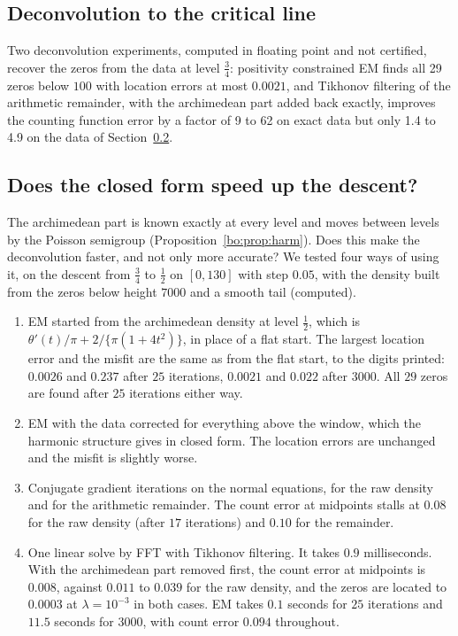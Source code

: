 \subsection{Deconvolution to the critical line}

Two deconvolution experiments, computed in floating point and not certified, recover the zeros from the data at level $\frac34$: positivity constrained EM finds all 29 zeros below $100$ with location errors at most $0.0021$, and Tikhonov filtering of the arithmetic remainder, with the archimedean part added back exactly, improves the counting function error by a factor of 9 to 62 on exact data but only 1.4 to 4.9 on the data of Section~\ref{bo:sec:speed}.

\subsection{Does the closed form speed up the descent?}\label{bo:sec:speed}

The archimedean part is known exactly at every level and moves between levels by the Poisson semigroup (Proposition~\ref{bo:prop:harm}). Does this make the deconvolution faster, and not only more accurate? We tested four ways of using it, on the descent from $\frac34$ to $\frac12$ on $[0,130]$ with step $0.05$, with the density built from the zeros below height $7000$ and a smooth tail (computed).

\begin{enumerate}
\item EM started from the archimedean density at level $\frac12$, which is $\theta'(t)/\pi+2/\{\pi(1+4t^2)\}$, in place of a flat start. The largest location error and the misfit are the same as from the flat start, to the digits printed: $0.0026$ and $0.237$ after $25$ iterations, $0.0021$ and $0.022$ after $3000$. All $29$ zeros are found after $25$ iterations either way.
\item EM with the data corrected for everything above the window, which the harmonic structure gives in closed form. The location errors are unchanged and the misfit is slightly worse.
\item Conjugate gradient iterations on the normal equations, for the raw density and for the arithmetic remainder. The count error at midpoints stalls at $0.08$ for the raw density (after $17$ iterations) and $0.10$ for the remainder.
\item One linear solve by FFT with Tikhonov filtering. It takes $0.9$ milliseconds. With the archimedean part removed first, the count error at midpoints is $0.008$, against $0.011$ to $0.039$ for the raw density, and the zeros are located to $0.0003$ at $\lambda=10^{-3}$ in both cases. EM takes $0.1$ seconds for $25$ iterations and $11.5$ seconds for $3000$, with count error $0.094$ throughout.
\end{enumerate}

